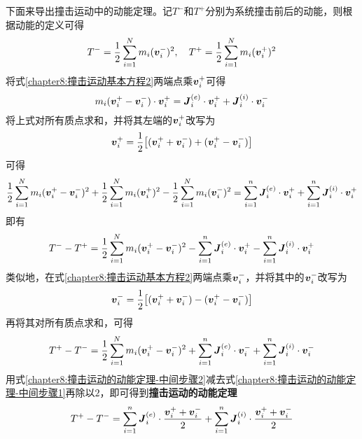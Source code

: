 下面来导出撞击运动中的动能定理。记$T^-$和$T^+$分别为系统撞击前后的动能，则根据动能的定义可得
\begin{equation}
	T^- = \frac12 \sum_{i=1}^Nm_i(\boldsymbol{v}_i^-)^2,\quad T^+ = \frac12 \sum_{i=1}^Nm_i(\boldsymbol{v}_i^+)^2
\end{equation}
将式\eqref{chapter8:撞击运动基本方程2}两端点乘$\boldsymbol{v}_i^+$可得
\begin{equation*}
	m_i(\boldsymbol{v}_i^+-\boldsymbol{v}_i^-)\cdot\boldsymbol{v}_i^+ = \boldsymbol{J}_i^{(e)}\cdot\boldsymbol{v}_i^+ + \boldsymbol{J}_i^{(i)}\cdot\boldsymbol{v}_i^-
\end{equation*}
将上式对所有质点求和，并将其左端的$\boldsymbol{v}_i^+$改写为
\begin{equation*}
	\boldsymbol{v}_i^+ = \frac12 \big[(\boldsymbol{v}_i^++\boldsymbol{v}_i^-)+(\boldsymbol{v}_i^+-\boldsymbol{v}_i^-)\big]
\end{equation*}
可得
\begin{equation*}
	\frac12 \sum_{i=1}^Nm_i(\boldsymbol{v}_i^+-\boldsymbol{v}_i^-)^2+\frac12 \sum_{i=1}^Nm_i(\boldsymbol{v}_i^+)^2-\frac12 \sum_{i=1}^Nm_i(\boldsymbol{v}_i^-)^2 = \sum_{i=1}^n\boldsymbol{J}_i^{(e)}\cdot\boldsymbol{v}_i^+ + \sum_{i=1}^n\boldsymbol{J}_i^{(i)}\cdot\boldsymbol{v}_i^+
\end{equation*}
即有
\begin{equation}
	T^--T^+ = \frac12 \sum_{i=1}^Nm_i(\boldsymbol{v}_i^+-\boldsymbol{v}_i^-)^2 - \sum_{i=1}^n\boldsymbol{J}_i^{(e)}\cdot\boldsymbol{v}_i^+ - \sum_{i=1}^n\boldsymbol{J}_i^{(i)}\cdot\boldsymbol{v}_i^+
	\label{chapter8:撞击运动的动能定理-中间步骤1}
\end{equation}
类似地，在式\eqref{chapter8:撞击运动基本方程2}两端点乘$\boldsymbol{v}_i^-$，并将其中的$\boldsymbol{v}_i^-$改写为
\begin{equation*}
	\boldsymbol{v}_i^- = \frac12 \big[(\boldsymbol{v}_i^++\boldsymbol{v}_i^-)-(\boldsymbol{v}_i^+-\boldsymbol{v}_i^-)\big]
\end{equation*}
再将其对所有质点求和，可得
\begin{equation}
	T^+-T^- = \frac12 \sum_{i=1}^Nm_i(\boldsymbol{v}_i^+-\boldsymbol{v}_i^-)^2 + \sum_{i=1}^n\boldsymbol{J}_i^{(e)}\cdot\boldsymbol{v}_i^- + \sum_{i=1}^n\boldsymbol{J}_i^{(i)}\cdot\boldsymbol{v}_i^-
	\label{chapter8:撞击运动的动能定理-中间步骤2}
\end{equation}
用式\eqref{chapter8:撞击运动的动能定理-中间步骤2}减去式\eqref{chapter8:撞击运动的动能定理-中间步骤1}再除以$2$，即可得到{\bf 撞击运动的动能定理}
\begin{equation}
	T^+-T^- = \sum_{i=1}^n\boldsymbol{J}_i^{(e)}\cdot \frac{\boldsymbol{v}_i^++\boldsymbol{v}_i^-}{2} + \sum_{i=1}^n\boldsymbol{J}_i^{(i)}\cdot \frac{\boldsymbol{v}_i^++\boldsymbol{v}_i^-}{2}
	\label{chapter8:撞击运动的动能定理}
\end{equation}

